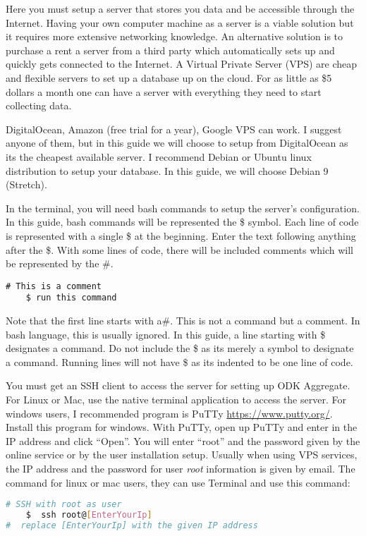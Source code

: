 
Here you must setup a server that stores you data and be accessible through the Internet. Having your own computer machine as a server is a viable solution but it requires more extensive networking knowledge. An alternative solution is to purchase a rent a server from a third party which automatically sets up and quickly gets connected to the Internet. A Virtual Private Server (VPS) are cheap and flexible servers to set up a database up on the cloud. For as little as \$5 dollars a month one can have a server with everything they need to start collecting data.

DigitalOcean, Amazon (free trial for a year), Google VPS can work. I suggest anyone of them, but in this guide we will choose to setup from DigitalOcean as its the cheapest available server. I recommend Debian or Ubuntu linux distribution to setup your database. In this guide, we will choose Debian 9 (Stretch).

\noindent
In the terminal, you will need bash commands to setup the server's configuration. In this guide, bash commands will be represented the \$ symbol. Each line of code is represented with a single \$ at the beginning. Enter the text following anything after the \$. With some lines of code, there will be included comments which will be represented by the \#.

\begin{lstlisting}
# This is a comment
	$ run this command   
\end{lstlisting}

Note that the first line starts with a\#. This is not a command but a comment. In bash language, this is usually ignored. In this guide, a line starting with \$ designates a command. Do not include the \$ as its merely a symbol to designate a command. Running lines will not have \$ as its indented to be one line of code.


You must get an SSH client to access the server for setting up ODK Aggregate. For Linux or Mac, use the native terminal application to access the server. For windows users, I recommended program is PuTTy \url{https://www.putty.org/}. Install this program for windows. With PuTTy, open up PuTTy and enter in the IP address and click ``Open''. You will enter ``root'' and the password given by the online service or by the user installation setup.  Usually when using VPS services, the IP address and the password for user \emph{root} information is given by email.
\noindent
The command for linux or mac users, they can use Terminal and use this command:
\begin{lstlisting}[language=bash]
# SSH with root as user
	$  ssh root@[EnterYourIp]   
#  replace [EnterYourIp] with the given IP address
\end{lstlisting}

